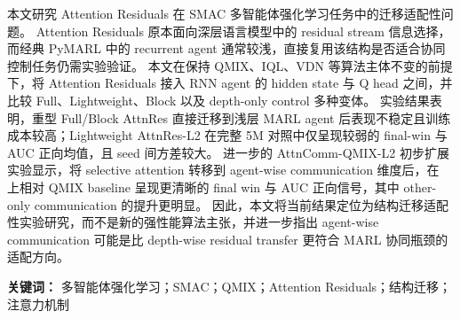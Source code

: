 本文研究 Attention Residuals 在 SMAC 多智能体强化学习任务中的迁移适配性问题。
Attention Residuals 原本面向深层语言模型中的 residual stream 信息选择，而经典 PyMARL 中的 recurrent agent 通常较浅，直接复用该结构是否适合协同控制任务仍需实验验证。
本文在保持 QMIX、IQL、VDN 等算法主体不变的前提下，将 Attention Residuals 接入 RNN agent 的 hidden state 与 Q head 之间，并比较 Full、Lightweight、Block 以及 depth-only control 多种变体。
实验结果表明，重型 Full/Block AttnRes 直接迁移到浅层 MARL agent 后表现不稳定且训练成本较高；Lightweight AttnRes-L2 在完整 5M  对照中仅呈现较弱的 final-win 与 AUC 正向均值，且 seed 间方差较大。
进一步的 AttnComm-QMIX-L2 初步扩展实验显示，将 selective attention 转移到 agent-wise communication 维度后，在  上相对 QMIX baseline 呈现更清晰的 final win 与 AUC 正向信号，其中 other-only communication 的提升更明显。
因此，本文将当前结果定位为结构迁移适配性实验研究，而不是新的强性能算法主张，并进一步指出 agent-wise communication 可能是比 depth-wise residual transfer 更符合 MARL 协同瓶颈的适配方向。

\textbf{关键词：} 多智能体强化学习；SMAC；QMIX；Attention Residuals；结构迁移；注意力机制
